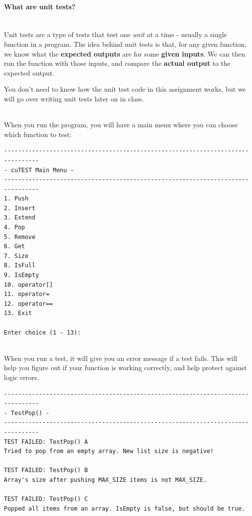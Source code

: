 \documentclass[a4paper,12pt]{book}
\begin{document}
            \paragraph{What are unit tests?} ~\\
            Unit tests are a type of tests that test one \textit{unit}
            at a time - usually a single function in a program. The
            idea behind unit tests is that, for any given function,
            we know what the \textbf{expected outputs} are for some
            \textbf{given inputs}. We can then run the function
            with those inputs, and compare the \textbf{actual output}
            to the expected output.

            You don't need to know how the unit test code in this assignment
            works, but we will go over writing unit tests later on in class.

            ~\\
            When you run the program, you will have a main menu where you
            can choose which function to test:

\begin{lstlisting}[style=output]
--------------------------------------------------------------------------------
- cuTEST Main Menu -
--------------------------------------------------------------------------------
1. Push
2. Insert
3. Extend
4. Pop
5. Remove
6. Get
7. Size
8. IsFull
9. IsEmpty
10. operator[]
11. operator=
12. operator==
13. Exit

Enter choice (1 - 13): 
\end{lstlisting}

            ~\\
            When you run a test, it will give you an error message if
            a test fails. This will help you figure out if your function
            is working correctly, and help protect against logic errors.

\begin{lstlisting}[style=output]
--------------------------------------------------------------------------------
- TestPop() -
--------------------------------------------------------------------------------
TEST FAILED: TestPop() A
Tried to pop from an empty array. New list size is negative!

TEST FAILED: TestPop() B
Array's size after pushing MAX_SIZE items is not MAX_SIZE.

TEST FAILED: TestPop() C
Popped all items from an array. IsEmpty is false, but should be true.
\end{lstlisting}
\end{document}
